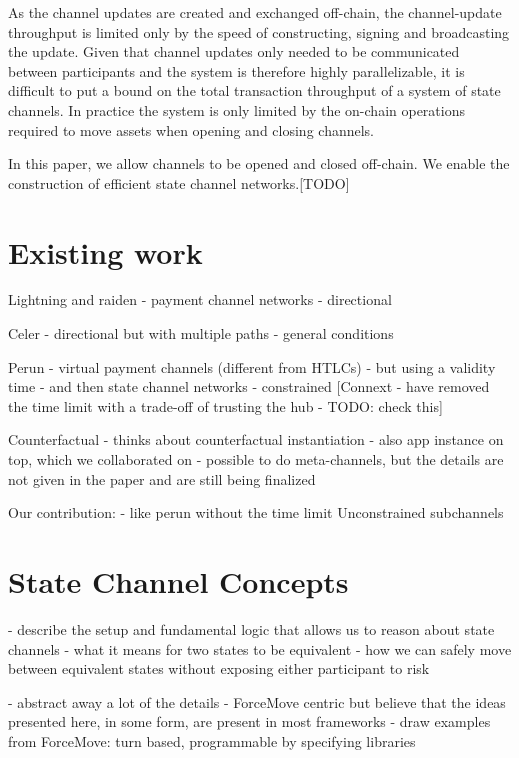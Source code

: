\documentclass{article}
\theoremstyle{definition}
\begin{document}
As the channel updates are created and exchanged off-chain, the channel-update throughput is limited only by the speed of constructing, signing and broadcasting the update.
Given that channel updates only needed to be communicated between participants and the system is therefore highly parallelizable, it is difficult to put a bound on the total transaction throughput of a system of state channels.
In practice the system is only limited by the on-chain operations required to move assets when opening and closing channels.

In this paper, we allow channels to be opened and closed off-chain. We enable the construction of efficient state channel networks.[TODO]

\section{Existing work}

Lightning and raiden
- payment channel networks
- directional

Celer
- directional but with multiple paths
- general conditions

Perun
- virtual payment channels (different from HTLCs)
- but using a validity time
- and then state channel networks
- constrained
[Connext - have removed the time limit with a trade-off of trusting the hub - TODO: check this]

Counterfactual
- thinks about counterfactual instantiation
- also app instance on top, which we collaborated on
- possible to do meta-channels, but the details are not given in the paper and are still being finalized

Our contribution:
- like perun without the time limit
Unconstrained subchannels

\section{State Channel Concepts}

- describe the setup and fundamental logic that allows us to reason about state channels
- what it means for two states to be equivalent
- how we can safely move between equivalent states without exposing either participant to risk

- abstract away a lot of the details
- ForceMove centric but believe that the ideas presented here, in some form, are present in most frameworks
- draw examples from ForceMove: turn based, programmable by specifying libraries
\end{document}
